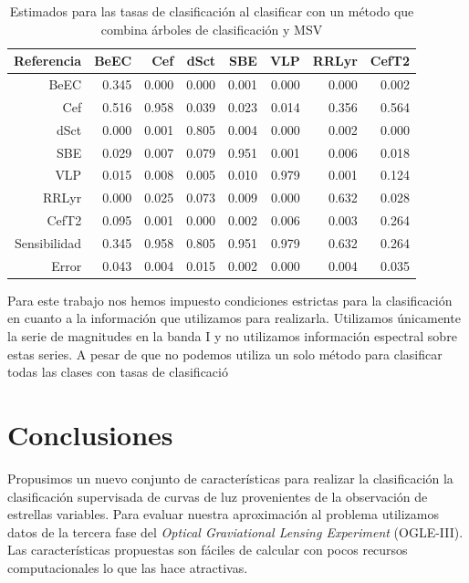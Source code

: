 \documentclass[letterpaper,12pt]{book}
\begin{document}
\begin{table}[ht]
  \centering
  \begin{tabular}{rrrrrrrr}
    \hline
    Referencia & BeEC & Cef & dSct & SBE & VLP & RRLyr & CefT2 \\ 
    \hline
    BeEC & 0.345 & 0.000 & 0.000 & 0.001 & 0.000 & 0.000 & 0.002 \\ 
    Cef & 0.516 & 0.958 & 0.039 & 0.023 & 0.014 & 0.356 & 0.564 \\ 
    dSct & 0.000 & 0.001 & 0.805 & 0.004 & 0.000 & 0.002 & 0.000 \\ 
    SBE & 0.029 & 0.007 & 0.079 & 0.951 & 0.001 & 0.006 & 0.018 \\ 
    VLP & 0.015 & 0.008 & 0.005 & 0.010 & 0.979 & 0.001 & 0.124 \\ 
    RRLyr & 0.000 & 0.025 & 0.073 & 0.009 & 0.000 & 0.632 & 0.028 \\ 
    CefT2 & 0.095 & 0.001 & 0.000 & 0.002 & 0.006 & 0.003 & 0.264 \\ 
    \hline
    \hline
    Sensibilidad & 0.345 & 0.958 & 0.805 & 0.951 & 0.979 & 0.632 & 0.264 \\ 
    \hline
    Error & 0.043 & 0.004 & 0.015 & 0.002 & 0.000 & 0.004 & 0.035 \\
    \hline
    \hline
  \end{tabular}
  \caption{Estimados para las tasas de clasificación al clasificar con un método que combina árboles de clasificación y MSV }
  \label{cuadro:clasificadorriollo}
\end{table} 



Para este trabajo nos hemos impuesto condiciones estrictas para la clasificación en cuanto a la información que utilizamos para realizarla. Utilizamos únicamente la serie de magnitudes en la banda I y no utilizamos información espectral sobre estas series. A pesar de que no podemos utiliza un solo método para  clasificar todas las clases con tasas de clasificació


\chapter{Conclusiones}

Propusimos un nuevo conjunto de características para realizar la clasificación la clasificación supervisada de curvas de luz provenientes de la observación de estrellas variables. Para evaluar nuestra aproximación al problema utilizamos datos de la tercera fase del \textit{Optical Graviational Lensing Experiment} (OGLE-III). Las características propuestas son fáciles de calcular con pocos recursos computacionales lo que las hace atractivas.
\end{document}
